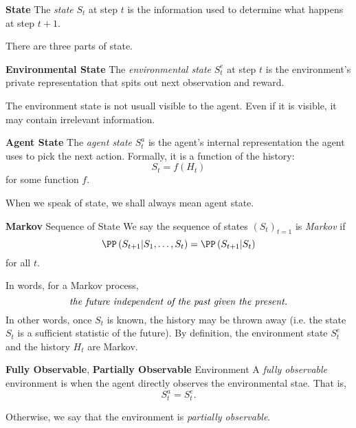 \documentclass[RL]{subfile}
\begin{document}
    \begin{definition}{\textbf{State}}
        The \emph{state} $S_t$ at step $t$ is the information used to determine what happens at step $t+1$. 
    \end{definition}

    \np There are three parts of state.

    \begin{definition}{\textbf{Environmental State}}
        The \emph{environmental state} $S_t^e$ at step $t$ is the environment's private representation that spits out next observation and reward.
    \end{definition}

    \np The environment state is not usuall visible to the agent. Even if it is visible, it may contain irrelevant information.

    \begin{definition}{\textbf{Agent State}}
        The \emph{agent state} $S_t^a$ is the agent's internal representation the agent uses to pick the next action. Formally, it is a function of the history:
        \begin{equation*}
            S_t = f\left( H_t \right)
        \end{equation*}
        for some function $f$.
    \end{definition}

    \np When we speak of state, we shall always mean agent state.

    \begin{definition}{\textbf{Markov} Sequence of State}
        We say the sequence of states $\left( S_{t} \right)^{}_{t=1}$ is \emph{Markov} if
        \begin{equation*}
            \PP\left( S_{t+1}|S_1,\ldots,S_t \right) = \PP\left( S_{t+1}|S_t \right) 
        \end{equation*}
        for all $t$.
    \end{definition}

    \np In words, for a Markov process,
    \begin{equation}
        \text{\textit{the future independent of the past given the present.}}
    \end{equation}
    In other words, once $S_t$ is known, the history may be thrown away (i.e. the state $S_t$ is a sufficient statistic of the future). By definition, the environment state $S_t^e$ and the history $H_t$ are Markov.

    \begin{definition}{\textbf{Fully Observable}, \textbf{Partially Observable} Environment}
        A \emph{fully observable} environment is when the agent directly observes the environmental stae. That is,
        \begin{equation*}
            S_t^a = S_t^e.
        \end{equation*}

        Otherwise, we say that the environment is \emph{partially observable}.
    \end{definition}
\end{document}

